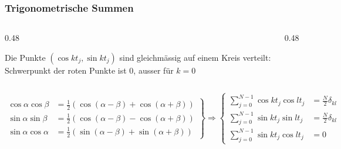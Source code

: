 %
%
\begin{frame}
\frametitle{Trigonometrische Summen}
\begin{columns}
\begin{column}{0.48\hsize}
\begin{geometrie}
Die Punkte $(\cos kt_j,\sin kt_j)$ sind gleichmässig auf einem Kreis verteilt:
\\[3pt]
Schwerpunkt der roten Punkte ist $0$,
ausser für $k=0$
\end{geometrie}
\end{column}
\begin{column}{0.48\hsize}
\def\r{1}
\end{column}
\end{columns}
\begin{produkte}
\vspace{-33pt}
\[
\left.
\begin{aligned}
\cos\alpha\cos\beta&={\textstyle\frac12}(\cos(\alpha-\beta)+\cos(\alpha+\beta))
\\
\sin\alpha\sin\beta&={\textstyle\frac12}(\cos(\alpha-\beta)-\cos(\alpha+\beta))
\\
\sin\alpha\cos\alpha&={\textstyle\frac12}(\sin(\alpha-\beta)+\sin(\alpha+\beta))
\end{aligned}
\right\}
\Rightarrow
\left\{
\begin{aligned}
\sum_{j=0}^{N-1}\cos kt_j\cos lt_j&=\frac{N}2\delta_{kl}
\\
\sum_{j=0}^{N-1}\sin kt_j\sin lt_j&=\frac{N}2\delta_{kl}
\\
\sum_{j=0}^{N-1}\sin kt_j\cos lt_j&=0
\end{aligned}
\right.
\]
\end{produkte}
\end{frame}


